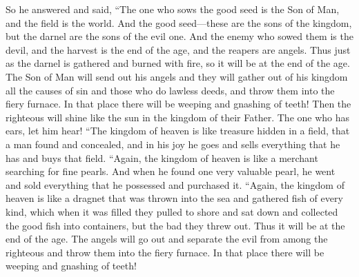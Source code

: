 \begin{biblechapter}
\verse So he answered and said, “The one who sows the good seed is the Son of Man,
\verse and the field is the world. And the good seed—these are the sons of the kingdom, but the darnel are the sons of the evil one.
\verse And the enemy who sowed them is the devil, and the harvest is the end of the age, and the reapers are angels.
\verse Thus just as the darnel is gathered and burned with fire, so it will be at the end of the age.
\verse The Son of Man will send out his angels and they will gather out of his kingdom all the causes of sin and those who do lawless deeds,
\verse and throw them into the fiery furnace. In that place there will be weeping and gnashing of teeth!
\verse Then the righteous will shine like the sun in the kingdom of their Father. The one who has ears, let him hear!
 “The kingdom of heaven is like treasure hidden in a field, that a man found and concealed, and in his joy he goes and sells everything that he has and buys that field.
 “Again, the kingdom of heaven is like a merchant searching for fine pearls.
\verse And when he found one very valuable pearl, he went and sold everything that he possessed and purchased it.
 “Again, the kingdom of heaven is like a dragnet that was thrown into the sea and gathered fish of every kind,
\verse which when it was filled they pulled to shore and sat down and collected the good fish into containers, but the bad they threw out.
\verse Thus it will be at the end of the age. The angels will go out and separate the evil from among the righteous
\verse and throw them into the fiery furnace. In that place there will be weeping and gnashing of teeth!

\end{biblechapter}
